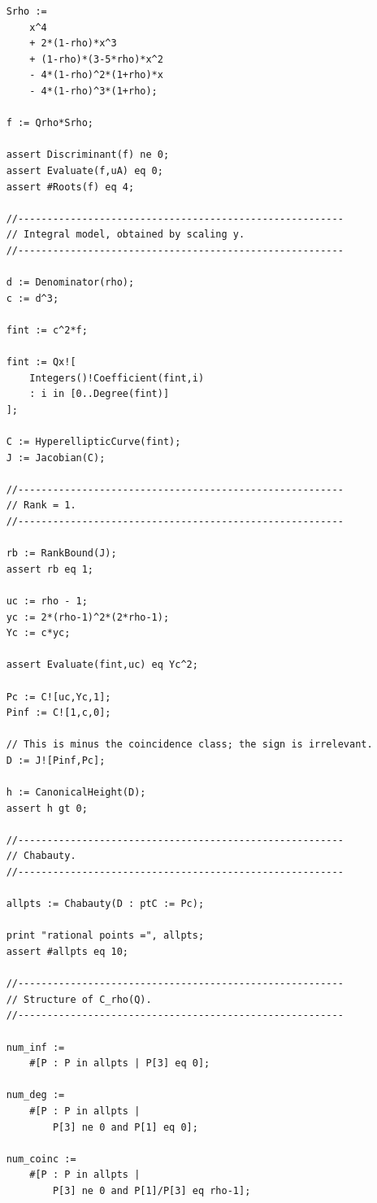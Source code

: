\documentclass[11pt]{amsart}
\theoremstyle{plain}
\theoremstyle{remark}
\theoremstyle{plain}
\begin{document}
\begin{verbatim}
    Srho :=
        x^4
        + 2*(1-rho)*x^3
        + (1-rho)*(3-5*rho)*x^2
        - 4*(1-rho)^2*(1+rho)*x
        - 4*(1-rho)^3*(1+rho);

    f := Qrho*Srho;

    assert Discriminant(f) ne 0;
    assert Evaluate(f,uA) eq 0;
    assert #Roots(f) eq 4;

    //--------------------------------------------------------
    // Integral model, obtained by scaling y.
    //--------------------------------------------------------

    d := Denominator(rho);
    c := d^3;

    fint := c^2*f;

    fint := Qx![
        Integers()!Coefficient(fint,i)
        : i in [0..Degree(fint)]
    ];

    C := HyperellipticCurve(fint);
    J := Jacobian(C);

    //--------------------------------------------------------
    // Rank = 1.
    //--------------------------------------------------------

    rb := RankBound(J);
    assert rb eq 1;

    uc := rho - 1;
    yc := 2*(rho-1)^2*(2*rho-1);
    Yc := c*yc;

    assert Evaluate(fint,uc) eq Yc^2;

    Pc := C![uc,Yc,1];
    Pinf := C![1,c,0];

    // This is minus the coincidence class; the sign is irrelevant.
    D := J![Pinf,Pc];

    h := CanonicalHeight(D);
    assert h gt 0;

    //--------------------------------------------------------
    // Chabauty.
    //--------------------------------------------------------

    allpts := Chabauty(D : ptC := Pc);

    print "rational points =", allpts;
    assert #allpts eq 10;

    //--------------------------------------------------------
    // Structure of C_rho(Q).
    //--------------------------------------------------------

    num_inf :=
        #[P : P in allpts | P[3] eq 0];

    num_deg :=
        #[P : P in allpts |
            P[3] ne 0 and P[1] eq 0];

    num_coinc :=
        #[P : P in allpts |
            P[3] ne 0 and P[1]/P[3] eq rho-1];


\end{verbatim}
\end{document}

